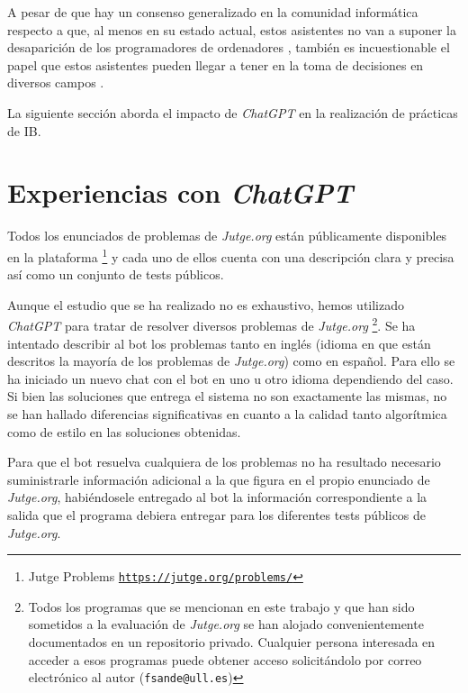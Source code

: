 \documentclass[twocolumn,twoside,a4paper, 10pt]{article}
\newcommand{\jutge}{\textit{Jutge.org}{}}           %
\newcommand{\ChatGPT}{\textit{ChatGPT}{}}           %
\begin{document}
A pesar de que hay un consenso generalizado en la comunidad informática respecto a que, al menos en su estado
actual, estos asistentes no van a suponer la desaparición de los programadores de ordenadores
\cite{Castelvecchi:2022:ACaA}, 
también es incuestionable el papel que estos asistentes pueden llegar a tener en la toma de decisiones en
diversos campos 
\cite{Kung:2022:PCU}.


La siguiente sección aborda el impacto de \ChatGPT{} en la realización de prácticas de IB.
\section{Experiencias con \ChatGPT{}}
Todos los enunciados de problemas de \jutge{} están públicamente disponibles en la
plataforma 
\footnote{Jutge Problems \href{https://jutge.org/problems/}{\scriptsize{\texttt{https://jutge.org/problems/}}}}
y cada uno de ellos cuenta con una descripción clara y precisa así como un conjunto de tests públicos.

Aunque el estudio que se ha realizado no es exhaustivo, hemos utilizado \ChatGPT{} para tratar de resolver
diversos problemas de \jutge{}
\footnote{
Todos los programas que se mencionan en este trabajo y que han sido sometidos a la evaluación de \jutge{} se
han alojado convenientemente documentados en un repositorio privado.
Cualquier persona interesada en acceder a esos programas puede obtener acceso solicitándolo por correo
electrónico al autor (\texttt{fsande@ull.es})
}. 
Se ha intentado describir al bot los problemas tanto en inglés (idioma en que están descritos la mayoría de
los problemas de \jutge{}) como en español.
Para ello se ha iniciado un nuevo chat con el bot en uno u otro idioma dependiendo del caso.
Si bien las soluciones que entrega el sistema no son exactamente las mismas, no se han hallado diferencias
significativas en cuanto a la calidad tanto algorítmica como de estilo en las soluciones obtenidas.


Para que el bot resuelva cualquiera de los problemas no ha resultado necesario suministrarle información
adicional a la que figura en el propio enunciado de \jutge{}, habiéndosele entregado al bot la información
correspondiente a la salida que el programa debiera entregar para los diferentes tests públicos de \jutge{}.
\end{document}
